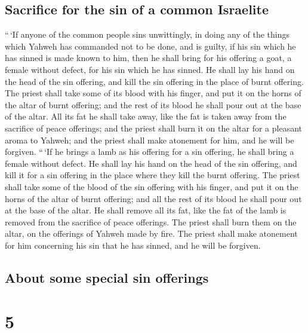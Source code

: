 \hypertarget{sacrifice-for-the-sin-of-a-common-israelite}{%
\subsection{Sacrifice for the sin of a common
Israelite}\label{sacrifice-for-the-sin-of-a-common-israelite}}

 ``\,`If anyone of the common people sins unwittingly, in
doing any of the things which Yahweh has commanded not to be done, and
is guilty,  if his sin which he has sinned is made known
to him, then he shall bring for his offering a goat, a female without
defect, for his sin which he has sinned.  He shall lay
his hand on the head of the sin offering, and kill the sin offering in
the place of burnt offering.  The priest shall take some
of its blood with his finger, and put it on the horns of the altar of
burnt offering; and the rest of its blood he shall pour out at the base
of the altar.  All its fat he shall take away, like the
fat is taken away from the sacrifice of peace offerings; and the priest
shall burn it on the altar for a pleasant aroma to Yahweh; and the
priest shall make atonement for him, and he will be forgiven.
 ``\,`If he brings a lamb as his offering for a sin
offering, he shall bring a female without defect.  He
shall lay his hand on the head of the sin offering, and kill it for a
sin offering in the place where they kill the burnt offering.
 The priest shall take some of the blood of the sin
offering with his finger, and put it on the horns of the altar of burnt
offering; and all the rest of its blood he shall pour out at the base of
the altar.  He shall remove all its fat, like the fat of
the lamb is removed from the sacrifice of peace offerings. The priest
shall burn them on the altar, on the offerings of Yahweh made by fire.
The priest shall make atonement for him concerning his sin that he has
sinned, and he will be forgiven.

\hypertarget{about-some-special-sin-offerings}{%
\subsection{About some special sin
offerings}\label{about-some-special-sin-offerings}}

\hypertarget{section-4}{%
\section{5}\label{section-4}}

